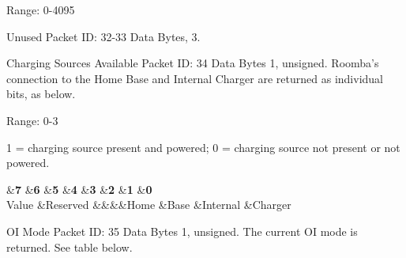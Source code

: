 \begin{Desc}
\begin{description}
Range\+: 0-\/4095 \item[{\em 
\hypertarget{group__roomba-lib_gga46f008b5055c4a08d3123c6a3478373ea96857c95ae47a3687fa89cbee702c45f}{}R\+O\+O\+M\+B\+A\+\_\+\+U\+N\+U\+S\+E\+D\+\_\+2\label{group__roomba-lib_gga46f008b5055c4a08d3123c6a3478373ea96857c95ae47a3687fa89cbee702c45f}
}]Unused Packet I\+D\+: 32-\/33 Data Bytes, 3. \item[{\em 
\hypertarget{group__roomba-lib_gga46f008b5055c4a08d3123c6a3478373ea837e14ab43e08cf649b5ab37556023de}{}R\+O\+O\+M\+B\+A\+\_\+\+C\+H\+A\+R\+G\+E\+R\+\_\+\+A\+V\+A\+I\+L\+A\+B\+L\+E\label{group__roomba-lib_gga46f008b5055c4a08d3123c6a3478373ea837e14ab43e08cf649b5ab37556023de}
}]Charging Sources Available Packet I\+D\+: 34 Data Bytes 1, unsigned. Roomba’s connection to the Home Base and Internal Charger are returned as individual bits, as below.

Range\+: 0-\/3

1 = charging source present and powered; 0 = charging source not present or not powered.

\begin{TabularC}{9}
\hline
{}&{\bf 7 }&{\bf 6 }&{\bf 5 }&{\bf 4 }&{\bf 3 }&{\bf 2 }&{\bf 1 }&{\bf 0  }\\
Value &Reserved &&&&Home &Base &Internal &Charger \\
\end{TabularC}
\item[{\em 
\hypertarget{group__roomba-lib_gga46f008b5055c4a08d3123c6a3478373eae25dca775bd76962783a86811ea93b74}{}R\+O\+O\+M\+B\+A\+\_\+\+O\+P\+E\+N\+\_\+\+I\+N\+T\+E\+R\+F\+A\+C\+E\+\_\+\+M\+O\+D\+E\label{group__roomba-lib_gga46f008b5055c4a08d3123c6a3478373eae25dca775bd76962783a86811ea93b74}
}]O\+I Mode Packet I\+D\+: 35 Data Bytes 1, unsigned. The current O\+I mode is returned. See table below.


\end{description}
\end{Desc}
